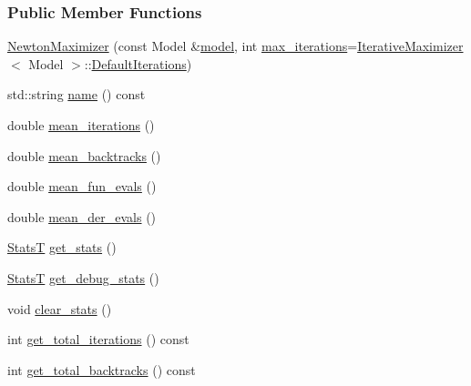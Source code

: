 \subsubsection*{Public Member Functions}
\begin{DoxyCompactItemize}
\item 
\hyperlink{classmappel_1_1estimator_1_1NewtonMaximizer_afb4fc4c96851217c838271ec9ad85213}{Newton\+Maximizer} (const Model \&\hyperlink{classmappel_1_1estimator_1_1Estimator_a2f157410771fb79a20d4d54e505750d0}{model}, int \hyperlink{classmappel_1_1estimator_1_1IterativeMaximizer_abf5fe0b08cfbcc403c3d01511726aa38}{max\+\_\+iterations}=\hyperlink{classmappel_1_1estimator_1_1IterativeMaximizer}{Iterative\+Maximizer}$<$ Model $>$\+::\hyperlink{classmappel_1_1estimator_1_1IterativeMaximizer_ab66c01c2eee630f3fca119f3fe09a19a}{Default\+Iterations})
\item 
std\+::string \hyperlink{classmappel_1_1estimator_1_1NewtonMaximizer_aeb1c7a33bf0da69c493192a6edeb92c1}{name} () const 
\item 
double \hyperlink{classmappel_1_1estimator_1_1IterativeMaximizer_a70504eeacb590296d249a51970736d3a}{mean\+\_\+iterations} ()
\item 
double \hyperlink{classmappel_1_1estimator_1_1IterativeMaximizer_a26cc129f7253798b7484a25ac59dfa71}{mean\+\_\+backtracks} ()
\item 
double \hyperlink{classmappel_1_1estimator_1_1IterativeMaximizer_ad6a2fc4797c19c411fde894669f1edba}{mean\+\_\+fun\+\_\+evals} ()
\item 
double \hyperlink{classmappel_1_1estimator_1_1IterativeMaximizer_a0fbb35e6f015bf1e1c5b1ee89f08cbad}{mean\+\_\+der\+\_\+evals} ()
\item 
\hyperlink{namespacemappel_a04ab395b0cf82c4ce68a36b2212649a5}{StatsT} \hyperlink{classmappel_1_1estimator_1_1IterativeMaximizer_a8a274f11cad09057aa2b0bc69f291c22}{get\+\_\+stats} ()
\item 
\hyperlink{namespacemappel_a04ab395b0cf82c4ce68a36b2212649a5}{StatsT} \hyperlink{classmappel_1_1estimator_1_1IterativeMaximizer_aa8f8cb9c66b559badee924617ec690b6}{get\+\_\+debug\+\_\+stats} ()
\item 
void \hyperlink{classmappel_1_1estimator_1_1IterativeMaximizer_a9c41aae7db286746e72e3d0ff8af1d13}{clear\+\_\+stats} ()
\item 
int \hyperlink{classmappel_1_1estimator_1_1IterativeMaximizer_a8c639ea1bf84e4531364906c933584af}{get\+\_\+total\+\_\+iterations} () const 
\item 
int \hyperlink{classmappel_1_1estimator_1_1IterativeMaximizer_a5b689ae57a9f2bf64739fab6d32ca74b}{get\+\_\+total\+\_\+backtracks} () const 

\end{DoxyCompactItemize}
